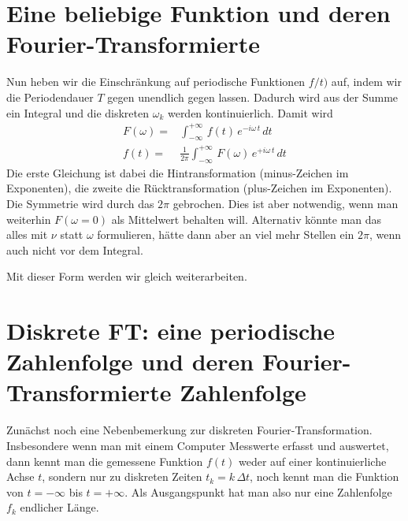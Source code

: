 \section{Eine beliebige Funktion und deren Fourier-Transformierte}

Nun heben wir die Einschränkung auf periodische Funktionen $f/t)$ auf, indem wir die Periodendauer $T$ gegen unendlich gegen lassen. Dadurch wird aus der Summe ein Integral und die diskreten $\omega_k$ werden kontinuierlich. Damit wird
\begin{align}
 F(\omega) = & \int_{-\infty}^{+\infty} \, f(t) \, e^{- i \omega\, t} \, dt \\
 f(t) = & \frac{1}{2 \pi } \int_{-\infty}^{+\infty} \, F(\omega) \, e^{+ i \omega\, t} \, dt 
\end{align}
Die erste Gleichung ist dabei die Hintransformation (minus-Zeichen im Exponenten), die zweite die Rücktransformation (plus-Zeichen im Exponenten). Die Symmetrie wird durch das $2 \pi$ gebrochen. Dies ist aber notwendig, wenn man weiterhin $F(\omega = 0)$ als Mittelwert behalten will. Alternativ könnte man das alles mit $\nu$ statt $\omega$  formulieren, hätte dann aber an viel mehr Stellen ein $2 \pi$, wenn auch nicht vor dem Integral.

Mit dieser Form werden wir gleich weiterarbeiten.

\section{Diskrete FT: eine periodische Zahlenfolge und deren Fourier-Transformierte Zahlenfolge}

Zunächst noch eine Nebenbemerkung zur diskreten Fourier-Transformation. Insbesondere wenn man mit einem Computer Messwerte erfasst und auswertet, dann kennt man die gemessene Funktion $f(t)$ weder auf einer kontinuierliche Achse $t$, sondern nur zu diskreten Zeiten $t_k = k \, \Delta t$, noch kennt man die Funktion von $t = - \infty$ bis $t = + \infty$. Als Ausgangspunkt hat man also nur eine Zahlenfolge $f_k$ endlicher Länge.

